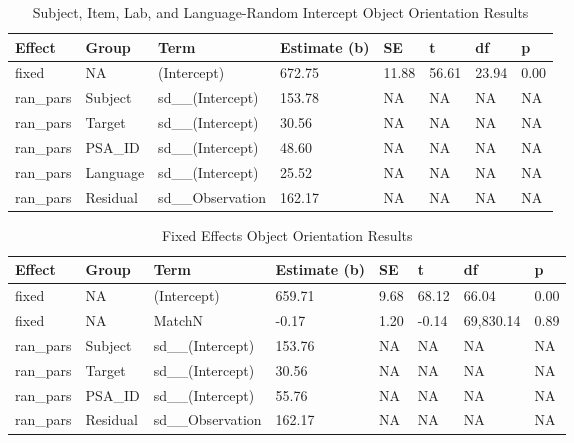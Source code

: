 \documentclass[
  man,floatsintext]{apa7}
\begin{document}
\begin{table}[tbp]

\begin{center}
\begin{threeparttable}

\caption{\label{tab:lang}Subject, Item, Lab, and Language-Random Intercept Object Orientation Results}

\begin{tabular}{llllllll}
\toprule
Effect & Group & Term & Estimate (b) & SE & t & df & p\\
\midrule
fixed & NA & (Intercept) & 672.75 & 11.88 & 56.61 & 23.94 & 0.00\\
ran\_pars & Subject & sd\_\_(Intercept) & 153.78 & NA & NA & NA & NA\\
ran\_pars & Target & sd\_\_(Intercept) & 30.56 & NA & NA & NA & NA\\
ran\_pars & PSA\_ID & sd\_\_(Intercept) & 48.60 & NA & NA & NA & NA\\
ran\_pars & Language & sd\_\_(Intercept) & 25.52 & NA & NA & NA & NA\\
ran\_pars & Residual & sd\_\_Observation & 162.17 & NA & NA & NA & NA\\
\bottomrule
\end{tabular}

\end{threeparttable}
\end{center}

\end{table}

\begin{table}[tbp]

\begin{center}
\begin{threeparttable}

\caption{\label{tab:fixed}Fixed Effects Object Orientation Results}

\begin{tabular}{llllllll}
\toprule
Effect & Group & Term & Estimate (b) & SE & t & df & p\\
\midrule
fixed & NA & (Intercept) & 659.71 & 9.68 & 68.12 & 66.04 & 0.00\\
fixed & NA & MatchN & -0.17 & 1.20 & -0.14 & 69,830.14 & 0.89\\
ran\_pars & Subject & sd\_\_(Intercept) & 153.76 & NA & NA & NA & NA\\
ran\_pars & Target & sd\_\_(Intercept) & 30.56 & NA & NA & NA & NA\\
ran\_pars & PSA\_ID & sd\_\_(Intercept) & 55.76 & NA & NA & NA & NA\\
ran\_pars & Residual & sd\_\_Observation & 162.17 & NA & NA & NA & NA\\
\bottomrule
\end{tabular}

\end{threeparttable}
\end{center}

\end{table}
\end{document}
